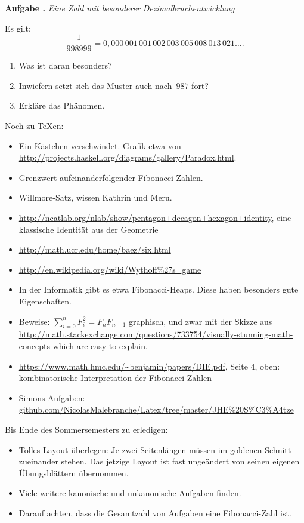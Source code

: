 \documentclass[a4paper,ngerman]{scrartcl}
\newlength{\aufgabenskip}
\newcounter{aufgabennummer}
\newenvironment{aufgabe}[1]{
  \addtocounter{aufgabennummer}{1}
  \textbf{Aufgabe \theaufgabennummer.} \emph{#1} \par
}{\vspace{\aufgabenskip}}
\begin{document}
\begin{aufgabe}{Eine Zahl mit besonderer Dezimalbruchentwicklung}
Es gilt:
\[ \frac{1}{998999} =
  0{,}000\,001\,001\,002\,003\,005\,008\,013\,021\ldots. \]
\begin{enumerate}
\item Was ist daran besonders?
\item Inwiefern setzt sich das Muster auch nach~$987$ fort?
\item Erkläre das Phänomen.
\end{enumerate}
\end{aufgabe}

\vfill

Noch zu \TeX{}en:
\begin{itemize}
\item Ein Kästchen verschwindet. Grafik etwa von
\url{http://projects.haskell.org/diagrams/gallery/Paradox.html}.
\item Grenzwert aufeinanderfolgender Fibonacci-Zahlen.
\item Willmore-Satz, wissen Kathrin und Meru.
\item \url{http://ncatlab.org/nlab/show/pentagon+decagon+hexagon+identity},
eine klassische Identität aus der Geometrie
\item \url{http://math.ucr.edu/home/baez/six.html}
\item \url{http://en.wikipedia.org/wiki/Wythoff%27s_game}
\item In der Informatik gibt es etwa Fibonacci-Heaps. Diese haben besonders
gute Eigenschaften.
\item Beweise: $\sum_{i=0}^n F_i^2 = F_n F_{n+1}$ graphisch, und zwar mit der
Skizze aus
\url{http://math.stackexchange.com/questions/733754/visually-stunning-math-concepts-which-are-easy-to-explain}.
\item \url{https://www.math.hmc.edu/~benjamin/papers/DIE.pdf}, Seite 4, oben:
kombinatorische Interpretation der Fibonacci-Zahlen
\item Simons Aufgaben:
\url{github.com/NicolasMalebranche/Latex/tree/master/JHE%20S%C3%A4tze}
\end{itemize}

Bis Ende des Sommersemesters zu erledigen:
\begin{itemize}
\item Tolles Layout überlegen: Je zwei Seitenlängen müssen im goldenen Schnitt
zueinander stehen. Das jetzige Layout ist fast ungeändert von seinen eigenen
Übungsblättern übernommen.
\item Viele weitere kanonische und unkanonische Aufgaben finden.
\item Darauf achten, dass die Gesamtzahl von Aufgaben eine Fibonacci-Zahl ist.
\end{itemize}
\end{document}
